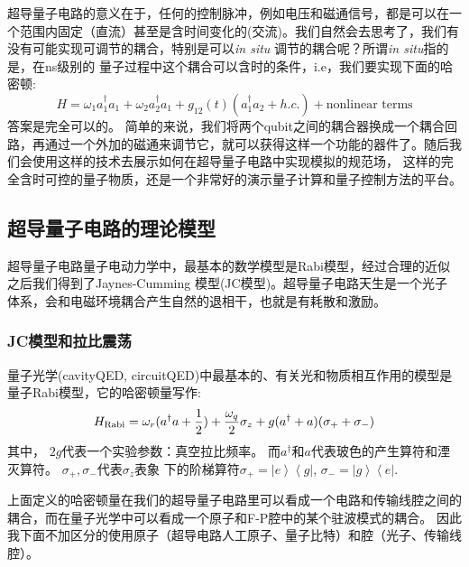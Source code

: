 \documentclass[supercite]{HustGraduPaper}
\newcommand{\bra}[1]{\left\langle #1 \right|}
\newcommand{\ket}[1]{\left| #1 \right\rangle}
\begin{document}
	   超导量子电路的意义在于，任何的控制脉冲，例如电压和磁通信号，都是可以在一个范围内固定（直流）甚至是含时间变化的(交流)。我们自然会去思考了，我们有没有可能实现可调节的耦合，特别是可以\textit{in situ} 调节的耦合呢？所谓\textit{in situ}指的是，在ns级别的
	   量子过程中这个耦合可以含时的条件，i.e，我们要实现下面的哈密顿:
	   \begin{equation}
		H = \omega_1 a_1^\dagger a_1 + \omega_2 a_2^\dagger a_1 + g_{12}(t)(a_1^\dagger a_2 + h.c.) + \text{nonlinear terms} 
	   \end{equation}
	   答案是完全可以的。 简单的来说，我们将两个qubit之间的耦合器换成一个耦合回路，再通过一个外加的磁通来调节它，就可以获得这样一个功能的器件了\cite{niskanen2007quantum,chen2014qubit,blais2003tunable}。随后我们会使用这样的技术去展示如何在超导量子电路中实现模拟的规范场，
	   这样的完全含时可控的量子物质，还是一个非常好的演示量子计算和量子控制方法的平台。
   
   \subsection{超导量子电路的理论模型}
   超导量子电路量子电动力学中，最基本的数学模型是Rabi模型\cite{you2006superconducting}，经过合理的近似之后我们得到了Jaynes-Cumming 模型(JC模型)。超导量子电路天生是一个光子
   体系\cite{blais2004cavity,blais2004cavity}，会和电磁环境耦合产生自然的退相干，也就是有耗散和激励。
   \subsubsection{JC模型和拉比震荡}
   量子光学(cavityQED, circuitQED)中最基本的、有关光和物质相互作用的模型是量子Rabi模型，它的哈密顿量写作:
	   \begin{equation}
		   H_{\text{Rabi}} = \omega_r (a^\dagger a + { 1\over 2}) + \frac{\omega_q}{2} \sigma_z + g(a^\dagger + a)(\sigma_+ + \sigma_-)
	   \end{equation}
	其中， $2g$代表一个实验参数：真空拉比频率。 而$a^\dagger$和$a$代表玻色的产生算符和湮灭算符。 $\sigma_+, \sigma_-$代表$\sigma_z$表象
	下的阶梯算符$\sigma_+ = \ket{e} \bra{g}$, $\sigma_- = \ket{g}\bra{e}$.

	上面定义的哈密顿量在我们的超导量子电路里可以看成一个电路和传输线腔之间的耦合，而在量子光学中可以看成一个原子和F-P腔中的某个驻波模式的耦合。
	因此我下面不加区分的使用原子（超导电路人工原子、量子比特）和腔（光子、传输线腔）。
	   
\end{document}
